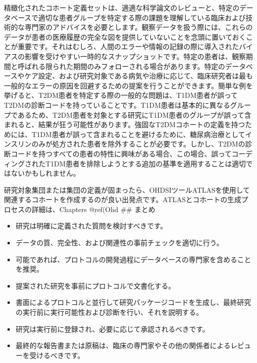 \documentclass[
  11pt]{book}
\makeatletter
\providecommand{\tightlist}{%
  \setlength{\itemsep}{0pt}\setlength{\parskip}{0pt}}
\newenvironment{kframe}{%
\medskip{}
\setlength{\fboxsep}{.8em}
 \def\at@end@of@kframe{}%
 \ifinner\ifhmode%
  \def\at@end@of@kframe{\end{minipage}}%
  \begin{minipage}{\columnwidth}%
 \fi\fi%
 \def\FrameCommand##1{\hskip\@totalleftmargin \hskip-\fboxsep
 \colorbox{myShadeColor}{##1}\hskip-\fboxsep
     \hskip-\linewidth \hskip-\@totalleftmargin \hskip\columnwidth}%
 \MakeFramed {\advance\hsize-\width
   \@totalleftmargin\z@ \linewidth\hsize
   \@setminipage}}%
 {\par\unskip\endMakeFramed%
 \at@end@of@kframe}
\newenvironment{rmdblock}[1]
  {
  \begin{itemize}
  \renewcommand{\labelitemi}{
    \raisebox{-.7\height}[0pt][0pt]{
      {\setkeys{Gin}{width=3em,keepaspectratio}\texttt{[image: images/\#1]}}
    }
  }
  \setlength{\fboxsep}{1em}
  \begin{kframe}
  \item
  }
  {
  \end{kframe}
  \end{itemize}
  }
\newenvironment{rmdsummary}
  {\begin{rmdblock}{summary}}
  {\end{rmdblock}}
\theoremstyle{definition}
\theoremstyle{definition}
\theoremstyle{definition}
\theoremstyle{definition}
\theoremstyle{remark}
\makeatother
\begin{document}
精緻化されたコホート定義セットは、適適な科学論文のレビューと、特定のデータベースで適切な患者グループを特定する際の課題を理解している臨床および技術的な専門家のアドバイスを必要とします。観察データを扱う際には、これらのデータが患者の医療履歴の完全な図を提供していないことを念頭に置いておくことが重要です。それはむしろ、人間のエラーや情報の記録の際に導入されたバイアスの影響を受けやすい一時的なスナップショットです。特定の患者は、観察期間と呼ばれる限られた期間のみフォローされる場合があります。特定のデータベースやケア設定、および研究対象である病気や治療に応じて、臨床研究者は最も一般的なエラーの原因を回避するための提案を行うことができます。簡単な例を挙げると、T2DM患者を特定する際の一般的な問題は、T1DM患者が誤ってT2DMの診断コードを持っていることです。T1DM患者は基本的に異なるグループであるため、T2DM患者を対象とする研究にT1DM患者のグループが誤って含まれると、結果が狂う可能性があります。強固なT2DMコホートの定義を持つためには、T1DM患者が誤って含まれることを避けるために、糖尿病治療としてインスリンのみが処方された患者を除外することが必要です。しかし、T2DMの診断コードを持つすべての患者の特性に興味がある場合、この場合、誤ってコーディングされたT1DM患者を排除しようとする追加の基準を適用することは適切ではないかもしれません。

研究対象集団または集団の定義が固まったら、OHDSIツールATLASを使用して関連するコホートを作成するのが良い出発点です。ATLASとコホートの生成プロセスの詳細は、Chapters @ref(Ohd
\#\# まとめ

\begin{rmdsummary}
\begin{itemize}
\tightlist
\item
  研究は明確に定義された質問を検討すべきです。
\item
  データの質、完全性、および関連性の事前チェックを適切に行う。
\item
  可能であれば、プロトコルの開発過程にデータベースの専門家を含めることを推奨。
\item
  提案された研究を事前にプロトコルで文書化する。
\item
  書面によるプロトコルと並行して研究パッケージコードを生成し、最終研究の実行前に実行可能性および診断を行い、それを説明する。
\item
  研究は実行前に登録され、必要に応じて承認されるべきです。
\item
  最終的な報告書または原稿は、臨床の専門家やその他の関係者によるレビューを受けるべきです。
\end{itemize}
\end{rmdsummary}
\end{document}
